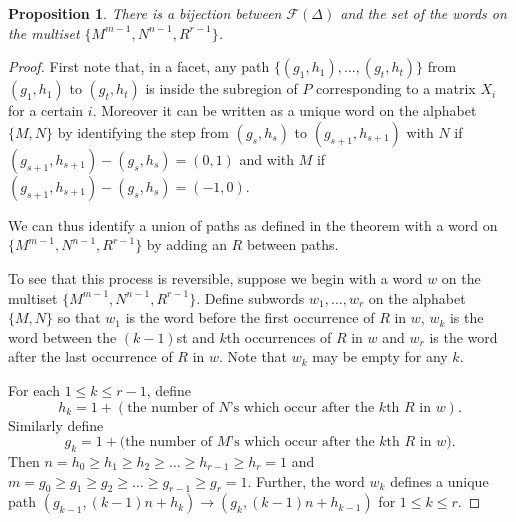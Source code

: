 \documentclass[12pt]{amsart}
\numberwithin{equation}{section}
\newtheorem{proposition}[theorem]{Proposition}
\theoremstyle{definition}
\begin{document}
\begin{proposition}
\label{NMR}
There is a bijection between $\mathcal{F}(\Delta)$ and the set of the words on the multiset $\{M^{m-1}, N^{n-1}, R^{r-1}\}$.
\end{proposition}
\begin{proof}
First note that, in a facet, any path $\{(g_1,h_1), \ldots, (g_t, h_t) \}$ from $(g_1, h_1)$ to $(g_t, h_t)$ is inside the subregion of $P$ corresponding to a matrix $X_i$ for a certain $i$. 
Moreover it can be written as a unique word on the alphabet $\{M, N\}$ by identifying the step from $(g_s, h_s)$ to $(g_{s+1}, h_{s+1})$ with $N$ if $(g_{s+1}, h_{s+1}) - (g_s, h_s) =  (0,1)$ and with $M$ if $(g_{s+1}, h_{s+1}) - (g_s, h_s) =  (-1,0)$. 

We can thus identify a union of paths as defined in the theorem with a word on $\{M^{m-1}, N^{n-1}, R^{r-1}\}$ by adding an $R$ between paths. 

To see that this process is reversible, suppose we begin with a word $w$ on the multiset $\{M^{m-1}, N^{n-1}, R^{r-1}\}$.  Define subwords $w_1, \dots, w_r$ on the alphabet $\{M,N\}$ so that $w_1$ is the word before the first occurrence of $R$ in $w$,  $w_k$ is the word between the $(k-1)$st and $k$th occurrences of $R$ in $w$ and $w_r$ is the word after the last occurrence of $R$ in $w$.  Note that $w_k$ may be empty for any $k$.  

For each $1 \leq k \leq r-1$, define 
\[
h_k = 1+(\mbox{the number of $N$'s which occur after the $k$th $R$ in $w$}).
\]
Similarly define 
\[
g_k = 1 + (\mbox{the number of $M$'s which occur after the $k$th $R$ in $w$)}.
\]
 Then $n=h_0\geq h_1\geq h_2\geq\ldots \geq h_{r-1}\geq h_r= 1$ and $m=g_0\geq g_1\geq g_2\geq \ldots \geq g_{r-1}\geq g_r= 1$. Further, the word $w_k$ defines a unique path $(g_{k-1}, (k-1)n+h_{k}) \longrightarrow (g_{k},(k-1)n+h_{k-1})$ for $1\leq k \leq r$.  

\end{proof}
\end{document}
